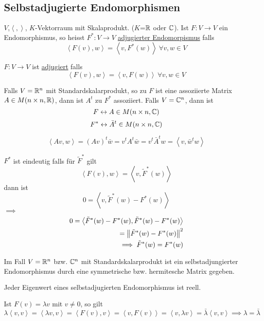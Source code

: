 \subsection{Selbstadjugierte Endomorphismen}
$V$,$\left\langle , \right\rangle$, $K$-Vektorraum mit Skalaprodukt. ($K$=$\mathbb{R}$ oder $\mathbb{C}$). Ist $F:V\to V$ ein Endomorphismus, so heisst $F^*:V\to V$ \underline{adjugierter Endomorpismus} falls 
\[\left\langle F(v),w \right\rangle = \left\langle v,F^*(w) \right\rangle\ \forall v,w\in V\]
\begin{Def}
  $F:V\to V$ ist \underline{adjugiert} falls
  \[\left\langle F(v),w \right\rangle=\left\langle v,F(w) \right\rangle\ \forall v,w\in V\]
\end{Def}
\begin{Eig}
  Falls $V=\mathbb{R}^n$ mit Standardskalarprodukt, so zu $F$ ist eine assoziierte Matrix $A\in M(n\times n,\mathbb{R})$, dann ist $A^t$ zu $F^*$ assoziiert.
  Falls $V=\mathbb{C}^n$, dann ist 
  \[F\leftrightarrow A\in M(n\times n,\mathbb{C})\]
  \[F^*\leftrightarrow \bar{A}^t\in M(n\times n,\mathbb{C})\]
\end{Eig}
\begin{Bew}
  \[\left\langle Av,w \right\rangle=(Av)^t\bar{w}=v^tA^t\bar{w}=v^t\bar{A}^tw=\left\langle v,\bar{w}^tw \right\rangle\]
\end{Bew}
\begin{Bem}
  $F^*$ ist eindeutig falls für $\tilde F^*$ gilt
  \[\left\langle F(v),w \right\rangle=\left\langle v,\tilde F^*(w) \right\rangle\]
  dann ist
  \[0=\left\langle v,\tilde F^*(w)-F^*(w) \right\rangle\]
  $\implies$
  \begin{align*}
    0=\left\langle \tilde F^*(w)-F^*(w),\tilde F^*(w)-F^*(w) \right\rangle\\
    =\left\| \tilde F^*(w)-F^*(w) \right\|^2\\
    \implies \tilde F^*(w)=F^*(w)
  \end{align*}
\end{Bem}
\begin{Faz}
  Im Fall $V=\mathbb{R}^n$ bzw. $\mathbb{C}^n$ mit Standardskalarprodukt ist ein selbstadjungierter Endomorphismus durch eine symmetrische bzw. hermitesche Matrix gegeben.
\end{Faz}
\begin{Lem}
  Jeder Eigenwert eines selbstadjugierten Endomorphismus ist reell.
\end{Lem}
\begin{Bew}
  Ist $F(v)=\lambda v$ mit $v\neq 0$, so gilt
  \[\lambda\left\langle v,v \right\rangle=\left\langle \lambda v,v \right\rangle=\left\langle F(v),v \right\rangle=\left\langle v,F(v) \right\rangle=\left\langle v,\lambda v \right\rangle=\bar \lambda\left\langle v,v \right\rangle \implies \lambda=\bar\lambda \]
\end{Bew}
